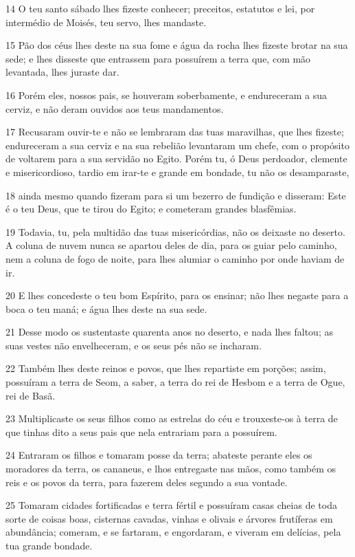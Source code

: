 \par 14 O teu santo sábado lhes fizeste conhecer; preceitos, estatutos e lei, por intermédio de Moisés, teu servo, lhes mandaste.
\par 15 Pão dos céus lhes deste na sua fome e água da rocha lhes fizeste brotar na sua sede; e lhes disseste que entrassem para possuírem a terra que, com mão levantada, lhes juraste dar.
\par 16 Porém eles, nossos pais, se houveram soberbamente, e endureceram a sua cerviz, e não deram ouvidos aos teus mandamentos.
\par 17 Recusaram ouvir-te e não se lembraram das tuas maravilhas, que lhes fizeste; endureceram a sua cerviz e na sua rebelião levantaram um chefe, com o propósito de voltarem para a sua servidão no Egito. Porém tu, ó Deus perdoador, clemente e misericordioso, tardio em irar-te e grande em bondade, tu não os desamparaste,
\par 18 ainda mesmo quando fizeram para si um bezerro de fundição e disseram: Este é o teu Deus, que te tirou do Egito; e cometeram grandes blasfêmias.
\par 19 Todavia, tu, pela multidão das tuas misericórdias, não os deixaste no deserto. A coluna de nuvem nunca se apartou deles de dia, para os guiar pelo caminho, nem a coluna de fogo de noite, para lhes alumiar o caminho por onde haviam de ir.
\par 20 E lhes concedeste o teu bom Espírito, para os ensinar; não lhes negaste para a boca o teu maná; e água lhes deste na sua sede.
\par 21 Desse modo os sustentaste quarenta anos no deserto, e nada lhes faltou; as suas vestes não envelheceram, e os seus pés não se incharam.
\par 22 Também lhes deste reinos e povos, que lhes repartiste em porções; assim, possuíram a terra de Seom, a saber, a terra do rei de Hesbom e a terra de Ogue, rei de Basã.
\par 23 Multiplicaste os seus filhos como as estrelas do céu e trouxeste-os à terra de que tinhas dito a seus pais que nela entrariam para a possuírem.
\par 24 Entraram os filhos e tomaram posse da terra; abateste perante eles os moradores da terra, os cananeus, e lhos entregaste nas mãos, como também os reis e os povos da terra, para fazerem deles segundo a sua vontade.
\par 25 Tomaram cidades fortificadas e terra fértil e possuíram casas cheias de toda sorte de coisas boas, cisternas cavadas, vinhas e olivais e árvores frutíferas em abundância; comeram, e se fartaram, e engordaram, e viveram em delícias, pela tua grande bondade.
